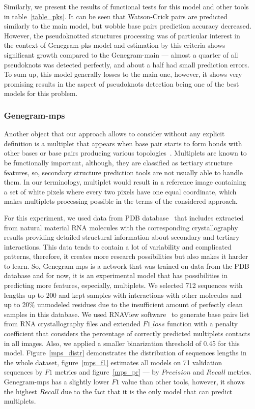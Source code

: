 Similarly, we present the results of functional tests for this model and other tools in table~\ref{table_pks}. It can be seen that Watson-Crick pairs are predicted similarly to the main model, but wobble base pairs prediction accuracy decreased. However, the pseudoknotted structures processing was of particular interest in the context of Genegram-pks model and estimation by this criteria shows significant growth compared to the Genegram-main --- almost a quarter of all pseudoknots was detected perfectly, and about a half had small prediction errors. To sum up, this model generally losses to the main one, however, it shows very promising results in the aspect of pseudoknots detection being one of the best models for this problem.



\subsubsection{Genegram-mps}
Another object that our approach allows to consider without any explicit definition is a multiplet that appears when base pair starts to form bonds with other bases or base pairs producing various topologies~\cite{bhattacharya2019going}. Multiplets are known to be functionally important, although, they are classified as tertiary structure features, so, secondary structure prediction tools are not usually able to handle them. In our terminology, multiplet would result in a reference image containing a set of white pixels where every two pixels have one equal coordinate, which makes multiplets processing possible in the terms of the considered approach.

For this experiment, we used data from PDB database~\cite{berman2000protein} that includes extracted from natural material RNA molecules with the corresponding crystallography results providing detailed structural information about secondary and tertiary interactions. This data tends to contain a lot of variability and complicated patterns, therefore, it creates more research possibilities but also makes it harder to learn. So, Genegram-mps is a network that was trained on data from the PDB database and for now, it is an experimental model that has possibilities in predicting more features, especially, multiplets. We selected 712 sequences with lengths up to 200 and kept samples with interactions with other molecules and up to 20\% unmodeled residues due to the insufficient amount of perfectly clean samples in this database. We used RNAView software~\cite{yang2003tools} to generate base pairs list from RNA crystallography files and extended $F1\_loss$ function with a penalty coefficient that considers the percentage of correctly predicted multiplets contacts in all images. Also, we applied a smaller binarization threshold of 0.45 for this model. Figure~\ref{mps_distr} demonstrates the distribution of sequences lengths in the whole dataset, figure~\ref{mps_f1} estimates all models on 71 validation sequences by $F1$ metrics and figure~\ref{mps_pr} --- by $Precision$ and $Recall$ metrics. Genegram-mps has a slightly lower $F1$ value than other tools, however, it shows the highest $Recall$ due to the fact that it is the only model that can predict multiplets. 

